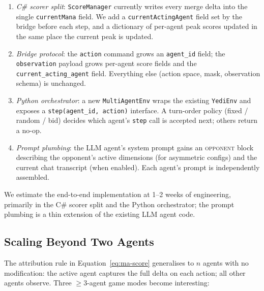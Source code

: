\documentclass[11pt]{article}
\begin{document}
\begin{enumerate}
  \item \emph{C\# scorer split}: \texttt{ScoreManager} currently writes
    every merge delta into the single \texttt{currentMana} field. We
    add a \texttt{currentActingAgent} field set by the bridge before each
    step, and a dictionary of per-agent peak scores updated in the same
    place the current peak is updated.
  \item \emph{Bridge protocol}: the \texttt{action} command grows an
    \texttt{agent\_id} field; the \texttt{observation} payload grows
    per-agent score fields and the \texttt{current\_acting\_agent}
    field. Everything else (action space, mask, observation schema) is
    unchanged.
  \item \emph{Python orchestrator}: a new \texttt{MultiAgentEnv} wraps
    the existing \texttt{YediEnv} and exposes a \texttt{step(agent\_id,
    action)} interface. A turn-order policy (fixed / random / bid)
    decides which agent's \texttt{step} call is accepted next; others
    return a no-op.
  \item \emph{Prompt plumbing}: the LLM agent's system prompt gains an
    \textsc{opponent} block describing the opponent's active dimensions
    (for asymmetric configs) and the current chat transcript (when
    enabled). Each agent's prompt is independently assembled.
\end{enumerate}

We estimate the end-to-end implementation at 1--2 weeks of engineering,
primarily in the C\# scorer split and the Python orchestrator; the
prompt plumbing is a thin extension of the existing LLM agent code.

\subsection{Scaling Beyond Two Agents}
\label{sec:ma-nagents}

The attribution rule in Equation~\ref{eq:ma-score} generalises to $n$
agents with no modification: the active agent captures the full delta on
each action; all other agents observe. Three $\geq 3$-agent game modes
become interesting:
\end{document}
